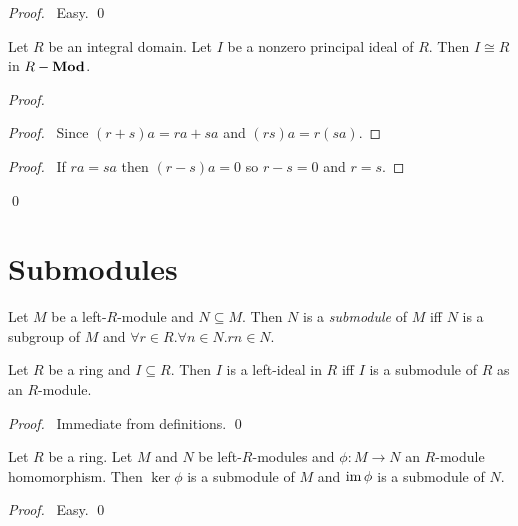 \begin{proof}
\pf\ Easy. \qed
\end{proof}

\begin{prop}
Let $R$ be an integral domain. Let $I$ be a nonzero principal ideal of $R$. Then $I \cong R$ in ${R}-\mathbf{Mod}$.
\end{prop}

\begin{proof}
\pf
{}
\begin{proof}
	\pf\ Since $(r+s)a = ra + sa$ and $(rs)a = r(sa)$.
\end{proof}
\begin{proof}
	\pf\ If $ra = sa$ then $(r-s)a = 0$ so $r - s = 0$ and $r = s$.
\end{proof}
\qed
\end{proof}

\section{Submodules}

\begin{df}[Submodule]
Let $M$ be a left-$R$-module and $N \subseteq M$. Then $N$ is a \emph{submodule} of $M$ iff $N$ is a subgroup of $M$ and $\forall r \in R. \forall n \in N. rn \in N$.
\end{df}

\begin{prop}
Let $R$ be a ring and $I \subseteq R$. Then $I$ is a left-ideal in $R$ iff $I$ is a submodule of $R$ as an $R$-module.
\end{prop}

\begin{proof}
\pf\ Immediate from definitions. \qed
\end{proof}

\begin{prop}
Let $R$ be a ring. Let $M$ and $N$ be left-$R$-modules and $\phi : M \rightarrow N$ an $R$-module homomorphism. Then $\ker \phi$ is a submodule of $M$ and $\operatorname{im} \phi$ is a submodule of $N$.
\end{prop}

\begin{proof}
\pf\ Easy. \qed
\end{proof}

